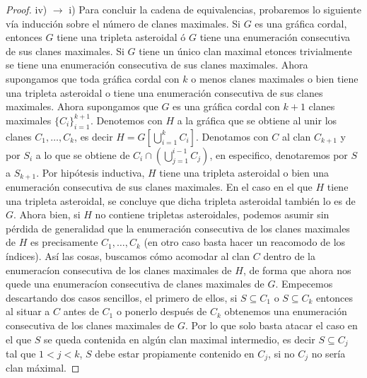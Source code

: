 \begin{proof}
    iv) $\to$ i) Para concluir la cadena de equivalencias, probaremos lo
    siguiente vía inducción sobre el número de clanes maximales. Si $G $ es una
    gráfica cordal, entonces $G$ tiene una tripleta asteroidal ó $G$ tiene una
    enumeración consecutiva de sus clanes maximales. Si $G$ tiene un único clan
    maximal etonces trivialmente se tiene una enumeración consecutiva de sus
    clanes maximales.  Ahora supongamos que toda gráfica cordal con $k$ o menos
    clanes maximales o bien tiene una tripleta asteroidal o tiene una
    enumeración consecutiva de sus clanes maximales. Ahora supongamos que $G$ es
    una gráfica cordal con $k+1$ clanes maximales $\{C_i\}_{i=1}^{k+1}$.
    Denotemos con $H$ a la gráfica que se obtiene al unir los clanes $C_1, \dots
    , C_k$, es decir $H=G[\bigcup_{i=1}^k C_i ]$. Denotamos con $C$ al clan
    $C_{k+1}$ y por $S_i$ a lo que se obtiene de $C_{i}\cap (\bigcup_{j=1}^{i-1}
    C_j)$, en especifico, denotaremos por $S$ a $S_{k+1}$. Por hipótesis
    inductiva, $H$ tiene una tripleta asteroidal o bien una enumeración
    consecutiva de sus clanes maximales. En el caso en el que $H$ tiene una
    tripleta asteroidal, se concluye que dicha tripleta asteroidal también lo es
    de $G$. Ahora bien, si $H$ no contiene tripletas asteroidales, podemos
    asumir sin pérdida de generalidad que la enumeración consecutiva de los
    clanes maximales de $H$ es precisamente $C_1,\dots, C_k$ (en otro caso basta
    hacer un reacomodo de los índices). Así las cosas, buscamos cómo acomodar al
    clan $C$ dentro de la enumeracíon consecutiva de los clanes maximales de
    $H$, de forma que ahora nos quede una enumeracíon consecutiva de clanes
    maximales de $G$. Empecemos descartando dos casos sencillos, el primero de
    ellos, si $S\subseteq C_1$ o $S\subseteq C_k$ entonces al situar a $C$ antes
    de $C_1$ o ponerlo después de $C_k$ obtenemos una enumeración consecutiva
    de los clanes maximales de $G$. Por lo que solo basta atacar el caso en el
    que $S$ se queda contenida en algún clan maximal intermedio, es decir
    $S\subseteq C_j$ tal que $1<j<k$, $S$ debe estar propiamente contenido en $C_j$, si no $C_j$ no sería clan m\'aximal.


\end{proof}
